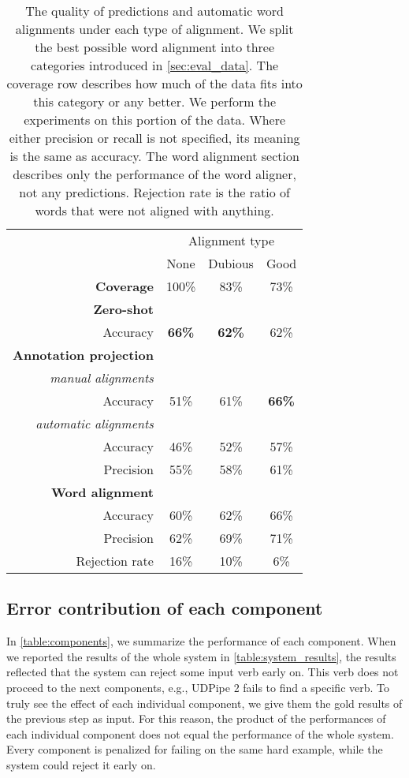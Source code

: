 \begin{table}
\centering
\begin{tabular}{rccc} 
& \multicolumn{3}{c}{Alignment type} \\
 & None & Dubious & Good \\
\hline
\textbf{Coverage}  & 100\% & 83\% & 73\% \\
\hline
\textbf{Zero-shot} \\
Accuracy & \textbf{66\%} & \textbf{62\%} & 62\% \\
\hline
\textbf{Annotation projection} \\
\textit{manual alignments} \\
Accuracy & 51\% & 61\% & \textbf{66\%} \\
\textit{automatic alignments} \\
Accuracy & 46\% & 52\% & 57\% \\
Precision & 55\% & 58\% & 61\% \\
\hline
\textbf{Word alignment} \\
Accuracy & 60\% & 62\% & 66\% \\
Precision & 62\% & 69\% & 71\% \\
Rejection rate & 16\% & 10\% & 6\% 
\end{tabular}
\caption{The quality of predictions and automatic word alignments under each type of alignment. We split the best possible word alignment into three categories introduced in \cref{sec:eval_data}. The coverage row describes how much of the data fits into this category or any better. We perform the experiments on this portion of the data. Where either precision or recall is not specified, its meaning is the same as accuracy. The word alignment section describes only the performance of the word aligner, not any predictions. Rejection rate is the ratio of words that were not aligned with anything.}
\label{table:alignment}
\end{table}

\subsection{Error contribution of each component}
\label{subs:components}

In \cref{table:components}, we summarize the performance of each component. When we reported the results of the whole system in \cref{table:system_results}, the results reflected that the system can reject some input verb early on. This verb does not proceed to the next components, e.g., UDPipe 2 fails to find a specific verb. To truly see the effect of each individual component, we give them the gold results of the previous step as input. For this reason, the product of the performances of each individual component does not equal the performance of the whole system. Every component is penalized for failing on the same hard example, while the system could reject it early on.

